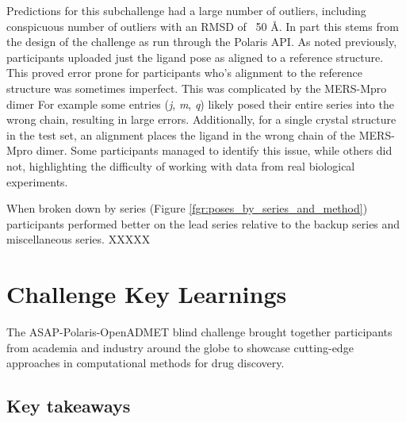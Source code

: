 \documentclass[journal=jcim,manuscript=article]{achemso}
\begin{document}
Predictions for this subchallenge had a large number of outliers, including conspicuous number of outliers with an RMSD of ~50 Å. In part this stems from the design of the challenge as run through the Polaris API. As noted previously, participants uploaded just the ligand pose as aligned to a reference structure. This proved error prone for participants who's alignment to the reference structure was sometimes imperfect. This was complicated by the MERS-Mpro dimer For example some entries (\textit{j}, \textit{m}, \textit{q}) likely posed their entire series into the wrong chain, resulting in large errors. Additionally, for a single crystal structure in the test set, an alignment places the ligand in the wrong chain of the MERS-Mpro dimer. Some participants managed to identify this issue, while others did not, highlighting the difficulty of working with data from real biological experiments.





When broken down by series (Figure \ref{fgr:poses_by_series_and_method}) participants performed better on the lead series relative to the backup series and miscellaneous series. XXXXX





\section{Challenge Key Learnings}


The ASAP-Polaris-OpenADMET blind challenge brought together participants from academia and industry around the globe to showcase cutting-edge approaches in computational methods for drug discovery.


\subsection{Key takeaways}
\end{document}
